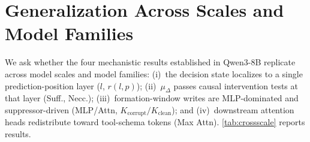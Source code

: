 \documentclass{article}
\begin{document}
\section{Generalization Across Scales and Model Families}
\label{sec:crossscale}

We ask whether the four mechanistic results established in Qwen3-8B replicate across model scales and model families:
(i)~the decision state localizes to a single prediction-position layer ($l$, $r(l,p)$);
(ii)~$\mu_\Delta$ passes causal intervention tests at that layer (Suff., Necc.);
(iii)~formation-window writes are MLP-dominated and suppressor-driven (MLP/Attn, $K_\mathrm{corrupt}/K_\mathrm{clean}$); and
(iv)~downstream attention heads redistribute toward tool-schema tokens (Max Attn).
\autoref{tab:crossscale} reports results.

\begin{table}[h]
  \centering
  \small
  \caption{Generalization across Qwen3 scales and additional model families. Entries marked \textbf{--} correspond to analyses that require a trained Transcoder to decompose model internals into interpretable features. Since Transcoders must be trained independently for each model architecture and scale — a process that is computationally prohibitive — we only use the trained Transcoders for the Qwen3 family \citep{hanna2026latentplanningemergesscale}, leaving these entries unavailable for other model families.}
  \label{tab:crossscale}
\end{table}
\end{document}
